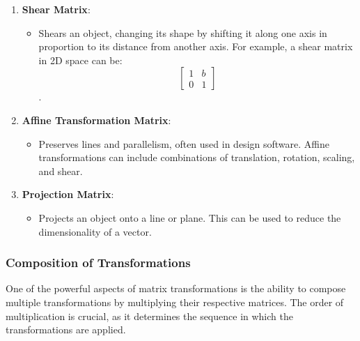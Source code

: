 \documentclass[11pt]{article}
\providecommand{\tightlist}{%
      \setlength{\itemsep}{0pt}\setlength{\parskip}{0pt}}
\begin{document}
\begin{enumerate}
  \begin{itemize}
  \tightlist
  \item
    Reflects an object across a specific axis or plane. For example, a
    reflection matrix in 2D space across the x-axis can be: \[
    \begin{bmatrix}
    1 & 0 \\
    0 & -1
    \end{bmatrix}
    \] .
  \end{itemize}
\item
  \textbf{Shear Matrix}:

  \begin{itemize}
  \tightlist
  \item
    Shears an object, changing its shape by shifting it along one axis
    in proportion to its distance from another axis. For example, a
    shear matrix in 2D space can be: \[
    \begin{bmatrix}
    1 & b \\
    0 & 1
    \end{bmatrix}
    \] .
  \end{itemize}
\item
  \textbf{Affine Transformation Matrix}:

  \begin{itemize}
  \tightlist
  \item
    Preserves lines and parallelism, often used in design software.
    Affine transformations can include combinations of translation,
    rotation, scaling, and shear.
  \end{itemize}
\item
  \textbf{Projection Matrix}:

  \begin{itemize}
  \tightlist
  \item
    Projects an object onto a line or plane. This can be used to reduce
    the dimensionality of a vector.
  \end{itemize}
\end{enumerate}

\hypertarget{composition-of-transformations}{%
\subsubsection{Composition of
Transformations}\label{composition-of-transformations}}

One of the powerful aspects of matrix transformations is the ability to
compose multiple transformations by multiplying their respective
matrices. The order of multiplication is crucial, as it determines the
sequence in which the transformations are applied.
\end{document}
